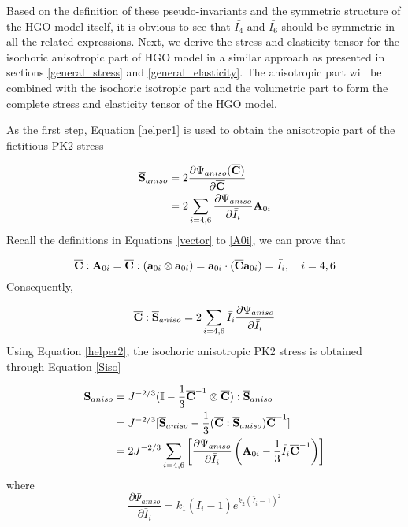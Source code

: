 Based on the definition of these pseudo-invariants and the symmetric structure of the HGO model itself, it is obvious to see that $\bar{I_4}$ and $\bar{I_6}$ should be symmetric in all the related expressions. Next, we derive the stress and elasticity tensor for the isochoric anisotropic part of HGO model in a similar approach as presented in sections \ref{general_stress} and \ref{general_elasticity}. The anisotropic part will be combined with the isochoric isotropic part and the volumetric part to form the complete stress and elasticity tensor of the HGO model.

As the first step, Equation \ref{helper1} is used to obtain the anisotropic part of the fictitious PK2 stress

\begin{equation} \label{Sbar3}
\begin{split}
\overline{\bold{S}}_{aniso} &=  2\frac{\partial\Psi_{aniso}({\overline{\bold{C}})}}{\partial\overline{\bold{C}}} \\
&= 2\sum_{i = 4, 6}\frac{\partial{\Psi_{aniso}}}{\partial{\bar{I}_i}}\bold{A}_{0i} 
\end{split}
\end{equation}
Recall the definitions in Equations \ref{vector} to \ref{A0i}, we can prove that

\begin{equation}
\overline{\bold{C}} : \bold{A}_{0i} = \overline{\bold{C}} : (\bold{a}_{0i} \otimes \bold{a}_{0i}) = \bold{a}_{0i} \cdot (\overline{\bold{C}} \bold{a}_{0i}) = \bar{I}_i, \quad i = 4, 6
\end{equation}
Consequently, 

\begin{equation} \label{helper2}
\overline{\bold{C}} : \overline{\bold{S}}_{aniso} = 2\sum_{i = 4, 6} \bar{I}_i \frac{\partial{\Psi_{aniso}}}{\partial{\bar{I}_i}}  
\end{equation}
Using Equation \ref{helper2}, the isochoric anisotropic PK2 stress is obtained through Equation \ref{Siso}

\begin{equation} \label{Sanisotropic}
\begin{split}
\bold{S}_{aniso}
&= J^{-2/3}(\mathbb{I} - \frac{1}{3}{\overline{\bold{C}}}^{-1} \otimes \overline{\bold{C}}) : \overline{\bold{S}}_{aniso} \\
&= J^{-2/3}[\overline{\bold{S}}_{aniso} - \frac{1}{3}(\overline{\bold{C}} : \overline{\bold{S}}_{aniso}){\overline{\bold{C}}}^{-1}] \\
&= 2J^{-2/3} \sum_{i = 4, 6}\left[\frac{\partial{\Psi_{aniso}}}{\partial{\bar{I}_i}}  \left(\bold{A}_{0i} - \frac{1}{3}\bar{I}_i\overline{\bold{C}}^{-1}\right)\right]
\end{split}
\end{equation}
where
\begin{equation} \label{HGOderivative1}
\frac{\partial\Psi_{aniso}}{\partial{\bar{I}_i}} = k_1(\bar{I}_i - 1)e^{k_2(\bar{I}_i - 1)^2}
\end{equation}


